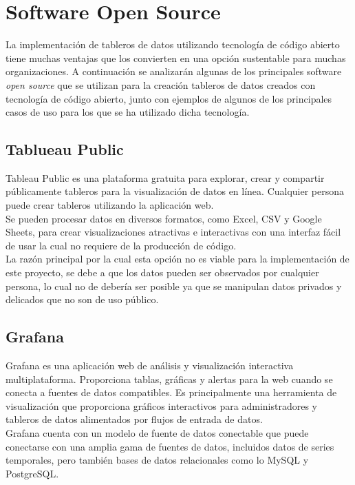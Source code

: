 \section{Software Open Source}
La implementación de tableros de datos utilizando tecnología de código abierto tiene muchas ventajas que los convierten en una opción sustentable para muchas organizaciones. A continuación se analizarán algunas de los principales software \textit{open source} que se utilizan para la creación tableros de datos creados con tecnología de código abierto, junto con ejemplos de algunos de los principales casos de uso para los que se ha utilizado dicha tecnología.

\subsection{Tablueau Public}
Tableau Public es una plataforma gratuita para explorar, crear y compartir públicamente tableros para la visualización de datos en línea. Cualquier persona puede crear tableros utilizando la aplicación web.\\
Se pueden procesar datos en diversos formatos, como Excel, CSV y Google Sheets, para crear visualizaciones atractivas e interactivas con una interfaz fácil de usar la cual no requiere de la producción de código.\\

La razón principal por la cual esta opción no es viable para la implementación de este proyecto, se debe a que los datos pueden ser observados por cualquier persona, lo cual no de debería ser posible ya que se manipulan datos privados y delicados que no son de uso público.

\subsection{Grafana}
Grafana es una aplicación web de análisis y visualización interactiva multiplataforma. Proporciona tablas, gráficas y alertas para la web cuando se conecta a fuentes de datos compatibles. Es principalmente una herramienta de visualización que proporciona gráficos interactivos para administradores y tableros de datos alimentados por flujos de entrada de datos.\\
Grafana cuenta con un modelo de fuente de datos conectable que puede conectarse con una amplia gama de fuentes de datos, incluidos datos de series temporales, pero también bases de datos relacionales como lo MySQL y PostgreSQL.\\


